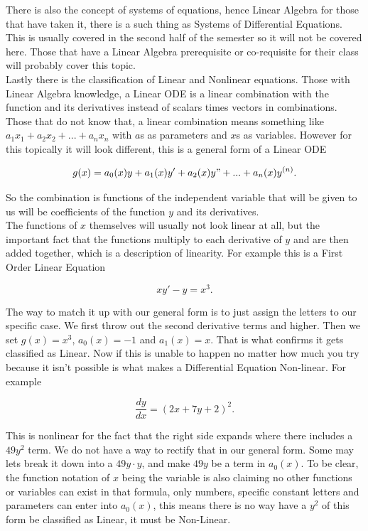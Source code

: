 \documentclass[12pt]{article}
\begin{document}
There is also the concept of systems of equations, hence Linear Algebra for those that have taken it, there is a such thing as Systems of Differential Equations. This is usually covered in the second half of the semester so it will not be covered here. Those that have a Linear Algebra prerequisite or co-requisite for their class will probably cover this topic. \\

Lastly there is the classification of Linear and Nonlinear equations. Those with Linear Algebra knowledge, a Linear ODE is a linear combination with the function and its derivatives instead of scalars times vectors in combinations. Those that do not know that, a linear combination means something like $a_1x_1+a_2x_2+...+a_nx_n$ with $a$s as parameters and $x$s as variables. However for this topically it will look different, this is a general form of a Linear ODE

\begin{equation*}
    g(x) = a_0(x)y+a_1(x)y'+a_2(x)y"+...+a_n(x)y^{(n)}.
\end{equation*}

So the combination is functions of the independent variable that will be given to us will be coefficients of the function $y$ and its derivatives. \\

The functions of $x$ themselves will usually not look linear at all, but the important fact that the functions multiply to each derivative of $y$ and are then added together, which is a description of linearity. For example this is a First Order Linear Equation

\begin{equation*}
    xy'-y = x^3.
\end{equation*}

The way to match it up with our general form is to just assign the letters to our specific case. We first throw out the second derivative terms and higher. Then we set $g(x)=x^3$, $a_0(x)=-1$ and $a_1(x)=x$. That is what confirms it gets classified as Linear. Now if this is unable to happen no matter how much you try because it isn't possible is what makes a Differential Equation Non-linear. For example

\begin{equation*}
    \frac{dy}{dx}=(2x+7y+2)^2.
\end{equation*}

This is nonlinear for the fact that the right side expands where there includes a $49y^2$ term. We do not have a way to rectify that in our general form. Some may lets break it down into a $49y\cdot y$, and make $49y$ be a term in $a_0(x)$. To be clear, the function notation of $x$ being the variable is also claiming no other functions or variables can exist in that formula, only numbers, specific constant letters and parameters can enter into $a_0(x)$, this means there is no way have a $y^2$ of this form be classified as Linear, it must be Non-Linear. 
\end{document}
